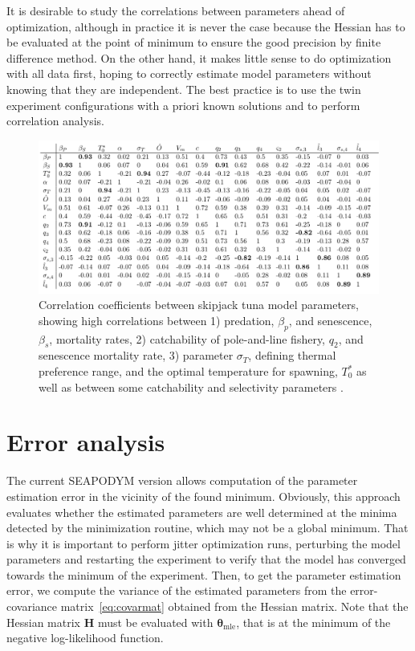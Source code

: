 It is desirable to study the correlations between parameters ahead of optimization, although in practice it is never the case because the Hessian has to be evaluated at the point of minimum to ensure the good precision by finite difference method. On the other hand, it makes little sense to do optimization with all data first, hoping to correctly estimate model parameters without knowing that they are independent. The best practice is to use the twin experiment configurations with a priori known solutions and to perform correlation analysis.

\begin{figure}[H]
	\centering
		\includegraphics[width=1.0\textwidth]{chapter4/figs/cor-table}
	\caption{Correlation coefficients between skipjack tuna model parameters, showing high correlations between 1) predation, $\beta_p$, and senescence, $\beta_s$, mortality rates, 2) catchability of pole-and-line fishery, $q_2$, and senescence mortality rate, 3) parameter $\sigma_T$, defining thermal preference range, and the optimal temperature for spawning, $T^{*}_0$ as well as between some catchability and selectivity parameters \citep*[From][]{Senina08}.}
	\label{fig:cor-table}
\end{figure}


\section{Error analysis}\label{sec:uncertainty}

The current SEAPODYM version allows computation of the parameter estimation error in the vicinity of the found minimum. Obviously, this approach evaluates whether the estimated parameters are well determined at the minima detected by the minimization routine, which may not be a global minimum. That is why it is important to perform jitter optimization runs, perturbing the model parameters and restarting the experiment to verify that the model has converged towards the minimum of the experiment. Then, to get the parameter estimation error, we compute the variance of the estimated parameters from the error-covariance matrix~\ref{eq:covarmat} obtained from the Hessian matrix. Note that the Hessian matrix $\mathbf{H}$ must be evaluated with $\boldsymbol\theta_{\text{mle}}$, that is at the minimum of the negative log-likelihood function.

